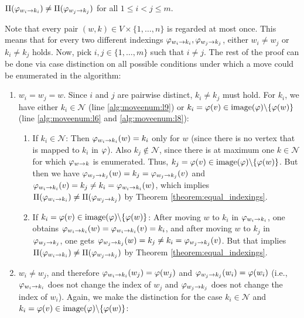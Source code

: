 \begin{lemmarep}
    $\Pi(\varphi_{w_i\rightarrow k_i}) \neq \Pi(\varphi_{w_j\rightarrow k_j})$ for all $1 \leq i < j \leq m$. \label{lemma:pairwise_distinctiveness}
\end{lemmarep}
\begin{\appendixproof}
    Note that every pair $(w,k) \in V \times \{1,\dots,n\}$ is regarded at most once. This means that for every two different indexings $\varphi_{w_i\rightarrow k_i},\varphi_{w_j\rightarrow k_j}$, either $w_i \neq w_j$ or $k_i \neq k_j$ holds. Now, pick $i,j \in \{1,\dots,m\}$ such that $i \neq j$. The rest of the proof can be done via case distinction on all possible conditions under which a move could be enumerated in the algorithm:
    \begin{enumerate}
        \item $w_i = w_j = w$. Since $i$ and $j$ are pairwise distinct, $k_i \neq k_j$ must hold. For $k_i$, we have either $k_i \in \mathcal{N}$ (line \ref{alg:moveenum:l9}) or $k_i = \varphi(v) \in \mathrm{image}(\varphi)\backslash \{ \varphi(w) \}$ (line \ref{alg:moveenum:l6} and \ref{alg:moveenum:l8}):
        \begin{enumerate}
            \item If $k_i \in \mathcal{N}$: Then $\varphi_{w_i\rightarrow k_i}(w) = k_i$ only for $w$ (since there is no vertex that is mapped to $k_i$ in $\varphi$). Also $k_j \not\in \mathcal{N}$, since there is at maximum one $k \in \mathcal{N}$ for which $\varphi_{w\rightarrow k}$ is enumerated. Thus, $k_j = \varphi(v) \in \mathrm{image}(\varphi)\backslash \{ \varphi(w) \}$. But then we have $\varphi_{w_j\rightarrow k_j}(w) = k_j =\varphi_{w_j\rightarrow k_j}(v)$ and $\varphi_{w_i\rightarrow k_i}(v) = k_j \neq k_i = \varphi_{w_i\rightarrow k_i}(w)$, which implies $\Pi(\varphi_{w_i\rightarrow k_i}) \neq \Pi(\varphi_{w_j\rightarrow k_j})$ by Theorem \ref{theorem:equal_indexings}.
            \item If $k_i = \varphi(v) \in \mathrm{image}(\varphi)\backslash \{\varphi(w) \}$: After moving $w$ to $k_i$ in $\varphi_{w_i\rightarrow k_i}$, one obtains $\varphi_{w_i\rightarrow k_i}(w) = \varphi_{w_i\rightarrow k_i}(v) = k_i$, and after moving $w$ to $k_j$ in $\varphi_{w_j\rightarrow k_j}$, one gets $\varphi_{w_j\rightarrow k_j}(w) = k_j \neq k_i = \varphi_{w_j\rightarrow k_j}(v)$. But that implies $\Pi(\varphi_{w_i\rightarrow k_i}) \neq \Pi(\varphi_{w_j\rightarrow k_j})$ by Theorem \ref{theorem:equal_indexings}.  
        \end{enumerate}
        \item $w_i \neq w_j$, and therefore $\varphi_{w_i\rightarrow k_i}(w_j) = \varphi(w_j)$ and $\varphi_{w_j\rightarrow k_j}(w_i) = \varphi(w_i)$ (i.e., $\varphi_{w_i\rightarrow k_i}$ does not change the index of $w_j$ and $\varphi_{w_j\rightarrow k_j}$ does not change the index of $w_i$). Again, we make the distinction for the case $k_i \in \mathcal{N}$ and $k_i = \varphi(v) \in \mathrm{image}(\varphi)\backslash \{ \varphi(w) \}$:

\end{enumerate}
\end{\appendixproof}
